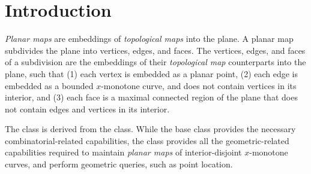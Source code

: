 
\def\Ipe#1{\def\IPEfile{#1}}

\renewcommand{\Re}{{\rm I\!\hspace{-0.025em} R}}

\def\C{{\cal C}}
\def\G{{\cal G}}
\def\F{{\cal F}}
\def\I{{\cal I}}
\def\U{{\cal U}}
\def\M{{\cal M}}
\def\eps{{\varepsilon}}
\def\bd{{\partial}}
\def\dm{{\cal D}}



\section{Introduction}
\label{PM_sec:intro}

{\em Planar maps} are embeddings of {\em topological maps} into the
plane. A planar map subdivides the plane into vertices, edges, and
faces. The vertices, edges, and faces of a subdivision are the
embeddings of their {\em topological map} counterparts into the plane,
such that (1) each vertex is embedded as a planar point, (2) each edge
is embedded as a bounded $x$-monotone curve, and does not contain
vertices in its interior, and (3) each face is a maximal connected
region of the plane that does not contain edges and vertices in its
interior.

The  class is derived from the
 class. While the
 base class provides the necessary
combinatorial-related capabilities, the
 class provides all the
geometric-related capabilities required to maintain {\em planar maps}
of interior-disjoint $x$-monotone curves, and perform
geometric queries, such as point location.

